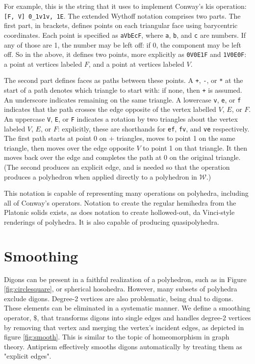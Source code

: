 \documentclass{article}
\begin{document}
For example, this is the string that it uses to implement Conway's kis
operation: \texttt{[F, V] 0\_1v1v, 1E}. The extended Wythoff notation comprises
two parts. The first part, in brackets, defines points on each triangular face
using barycentric coordinates. Each point is specified as \texttt{aVbEcF}, where
\texttt{a}, \texttt{b}, and \texttt{c} are numbers. If any of those are 1, the
number may be left off: if 0, the component may be left off. So in the above,
it defines two points, more explicitly as \texttt{0V0E1F} and \texttt{1V0E0F}:
a point at vertices labeled $F$, and a point at vertices labeled $V$.

The second part defines faces as paths between these points. A \texttt{+},
\texttt{-}, or \texttt{*} at the start of a path denotes which triangle to
start with: if none, then \texttt{+} is assumed. An underscore indicates
remaining on the same triangle. A lowercase \texttt{v}, \texttt{e}, or
\texttt{f} indicates that the path crosses the edge opposite of the vertex
labelled $V$, $E$, or $F$. An uppercase \texttt{V}, \texttt{E}, or \texttt{F}
indicates a rotation by two triangles about the vertex labeled $V$, $E$, or $F$:
explicitly, these are shorthands for \texttt{ef}, \texttt{fv}, and \texttt{ve}
respectively. The first path starts at point 0 on + triangles, moves to point 1
on the same triangle, then moves over the edge opposite $V$ to point 1 on
that triangle. It then moves back over the edge and completes the path at 0
on the original triangle. (The second produces an explicit edge, and is needed
so that the operation produces a polyhedron when applied directly to a
polyhedron in $\mathcal{W}$.)

This notation is capable of representing many operations on polyhedra,
including all of Conway's operators. Notation to create the regular hemihedra
from the Platonic solids exists, as does notation to create hollowed-out,
da Vinci-style renderings of polyhedra.
It is also capable of producing quasipolyhedra.

\section{Smoothing}

Digons can be present in a faithful realization of a polyhedron, such as in
Figure \ref{fig:circlesquare}, or spherical hosohedra. However, many subsets of
polyhedra exclude digons. Degree-2 vertices are also problematic, being dual to
digons. These elements can be eliminated in a systematic manner. We define a
smoothing operator, $\$$, that transforms digons into single edges and handles
degree-2 vertices by removing that vertex and merging the vertex's incident
edges, as depicted in figure \ref{fig:smooth}. This is similar to the topic of
homeomorphism in graph theory. Antiprism effectively smooths digons
automatically by treating them as "explicit edges".
\end{document}
